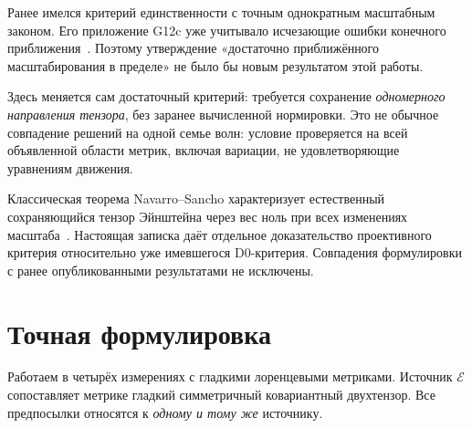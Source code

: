 \documentclass[11pt,a4paper]{article}
\newcommand{\E}{\mathcal E}
\begin{document}
Ранее имелся критерий единственности с точным однократным масштабным законом. Его приложение G12c уже учитывало исчезающие ошибки конечного приближения~\cite{golden}. Поэтому утверждение «достаточно приближённого масштабирования в пределе» не было бы новым результатом этой работы.

Здесь меняется сам достаточный критерий: требуется сохранение \emph{одномерного направления тензора}, без заранее вычисленной нормировки. Это не обычное совпадение решений на одной семье волн: условие проверяется на всей объявленной области метрик, включая вариации, не удовлетворяющие уравнениям движения.

Классическая теорема Navarro--Sancho характеризует естественный сохраняющийся тензор Эйнштейна через вес ноль при всех изменениях масштаба~\cite{navarro}. Настоящая записка даёт отдельное доказательство проективного критерия относительно уже имевшегося D0-критерия. Совпадения формулировки с ранее опубликованными результатами не исключены.

\section{Точная формулировка}
Работаем в четырёх измерениях с гладкими лоренцевыми метриками. Источник $\E$ сопоставляет метрике гладкий симметричный ковариантный двухтензор. Все предпосылки относятся к \emph{одному и тому же} источнику.
\end{document}
